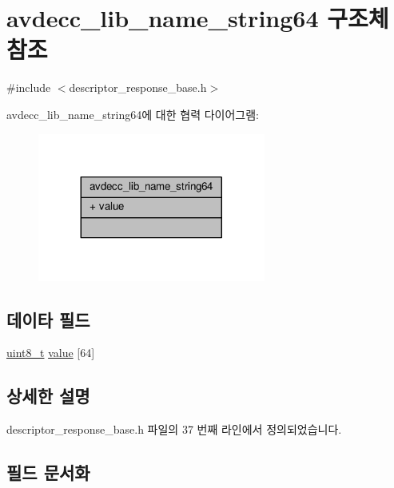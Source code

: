 \hypertarget{structavdecc__lib_1_1avdecc__lib__name__string64}{}\section{avdecc\+\_\+lib\+\_\+name\+\_\+string64 구조체 참조}
\label{structavdecc__lib_1_1avdecc__lib__name__string64}


{\ttfamily \#include $<$descriptor\+\_\+response\+\_\+base.\+h$>$}



avdecc\+\_\+lib\+\_\+name\+\_\+string64에 대한 협력 다이어그램\+:
\nopagebreak
\begin{figure}[H]
\begin{center}
\leavevmode
\includegraphics[width=212pt]{structavdecc__lib_1_1avdecc__lib__name__string64__coll__graph}
\end{center}
\end{figure}
\subsection*{데이타 필드}
\begin{DoxyCompactItemize}
\item 
\hyperlink{stdint_8h_aba7bc1797add20fe3efdf37ced1182c5}{uint8\+\_\+t} \hyperlink{structavdecc__lib_1_1avdecc__lib__name__string64_a7968db9d35aabae83b5c038723160e28}{value} \mbox{[}64\mbox{]}
\end{DoxyCompactItemize}


\subsection{상세한 설명}


descriptor\+\_\+response\+\_\+base.\+h 파일의 37 번째 라인에서 정의되었습니다.



\subsection{필드 문서화}
